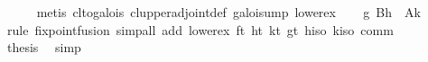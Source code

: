 \begin{isabellebody}
\ \ \ \ \isamarkupfalse%
\ {}metis\ cl{}to{}galois\ cl{}upper{}adjoint{}def\ galois{}ump{}\ lower{}ex{}\isanewline
\ \ \isamarkupfalse%
\ {}g\ {}{}\isactrlbsub B{}\isactrlesub h{}\ {}\ {}\isactrlbsub A{}\isactrlesub k{}\isanewline
\ \ \ \ \isamarkupfalse%
\ {}rule\ fixpoint{}fusion{}\ simp{}all\ add{}\ lower{}ex\ ft\ ht\ kt\ gt\ hiso\ kiso\ comm{}\isanewline
\ \ \isamarkupfalse%
\ {}thesis\ \isamarkupfalse%
\ simp\isanewline
{}\isamarkupfalse%
%
\endisatagproof
{\isafoldproof}%
%
\isadelimproof
\isanewline
%
\endisadelimproof
%
\isadelimtheory
\isanewline
%
\endisadelimtheory
%
\isatagtheory
{}\isamarkupfalse%
%
\endisatagtheory
{\isafoldtheory}%
%
\isadelimtheory
\isanewline
%
\endisadelimtheory
\end{isabellebody}%

